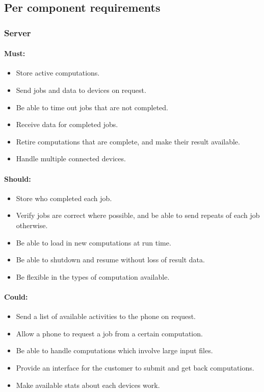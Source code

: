 \documentclass[a4paper,10pt]{article}
\begin{document}
\subsection{Per component requirements}

\subsubsection{Server}

\paragraph{Must:}

\begin{itemize}
\item Store active computations.
\item Send jobs and data to devices on request.
\item Be able to time out jobs that are not completed.
\item Receive data for completed jobs.
\item Retire computations that are complete, and make their result available.
\item Handle multiple connected devices.
\end{itemize}

\paragraph{Should:}

\begin{itemize}
\item Store who completed each job.
\item Verify jobs are correct where possible, and be able to send repeats of each job otherwise.
\item Be able to load in new computations at run time.
\item Be able to shutdown and resume without loss of result data.
\item Be flexible in the types of computation available.
\end{itemize}

\paragraph{Could:}

\begin{itemize}
\item Send a list of available activities to the phone on request.
\item Allow a phone to request a job from a certain computation.
\item Be able to handle computations which involve large input files.
\item Provide an interface for the customer to submit and get back computations.
\item Make available stats about each devices work.
\end{itemize}
\end{document}
